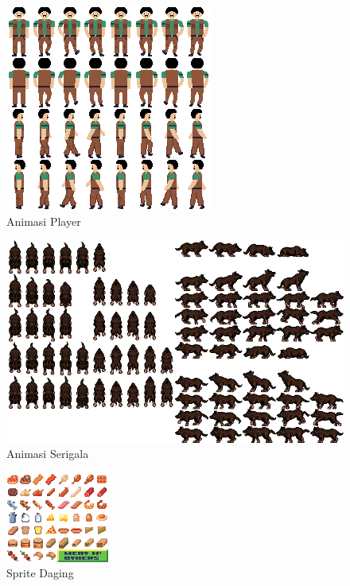\documentclass[oneside, a4paper ,12pt]{book}
\begin{document}
	\begin{figure} [h]
		\centering
		\includegraphics[width=10 cm]{lakon.png}
		\caption{Animasi Player}
	\end{figure}
	\begin{figure} [h]
		\centering
		\includegraphics[width=10 cm]{wolf.png}
		\caption{Animasi Serigala}
	\end{figure}
	\begin{figure}
		\centering
		\includegraphics[width=10 cm]{MeatnOthers.png}
		\caption{Sprite Daging}
	\end{figure}
\end{document}
